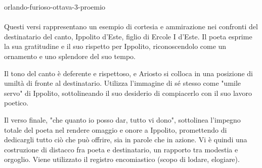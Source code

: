 \documentclass[preview]{standalone}
\begin{document}
\begin{snippet}{orlando-furioso-ottava-3-proemio}
    \\\\
    Questi versi rappresentano un esempio di cortesia e
    ammirazione nei confronti del destinatario del canto,
    Ippolito d'Este, figlio di Ercole I d'Este.
    Il poeta esprime la sua gratitudine e il suo rispetto
    per Ippolito, riconoscendolo come un ornamento
    e uno splendore del suo tempo.

    Il tono del canto è deferente e rispettoso,
    e Ariosto si colloca in una posizione di umiltà di
    fronte al destinatario.
    Utilizza l'immagine di sé stesso come "umile servo" di Ippolito,
    sottolineando il suo desiderio di compiacerlo con
    il suo lavoro poetico.

    Il verso finale, "che quanto io posso dar, tutto vi dono",
    sottolinea l'impegno totale del poeta nel rendere omaggio
    e onore a Ippolito, promettendo di dedicargli tutto
    ciò che può offrire, sia in parole che in azione.
    Vi è quindi una costruzione di distacco fra poeta e destinatario,
    un rapporto tra modestia e orgoglio. Viene utilizzato il registro
    encomiastico (scopo di lodare, elogiare).
\end{snippet}
\end{document}
